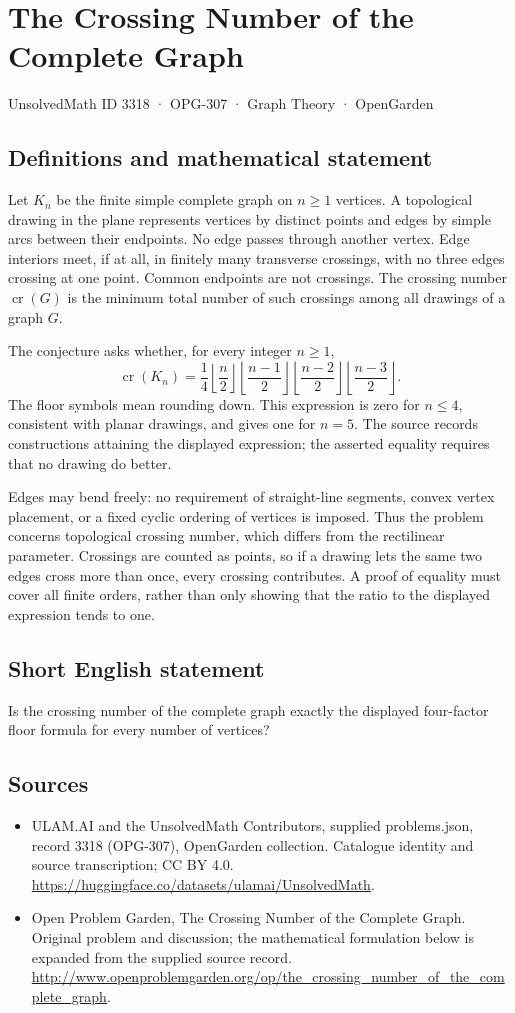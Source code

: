 \documentclass[11pt,a4paper]{article}
\begin{document}
\section*{The Crossing Number of the Complete Graph}\label{3318}
{\small UnsolvedMath ID 3318 · OPG-307 · Graph Theory · OpenGarden}
\subsection{Definitions and mathematical statement}
Let $K_n$ be the finite simple complete graph on $n\ge1$ vertices.
A topological drawing in the plane represents vertices by distinct
points and edges by simple arcs between their endpoints. No edge
passes through another vertex. Edge interiors meet, if at all, in
finitely many transverse crossings, with no three edges crossing
at one point. Common endpoints are not crossings. The crossing
number $\operatorname{cr}(G)$ is the minimum total number of such
crossings among all drawings of a graph $G$.

The conjecture asks whether, for every integer $n\ge1$,
\[
 \operatorname{cr}(K_n)=
 \frac14\left\lfloor\frac n2\right\rfloor
          \left\lfloor\frac{n-1}2\right\rfloor
          \left\lfloor\frac{n-2}2\right\rfloor
          \left\lfloor\frac{n-3}2\right\rfloor.
\]
The floor symbols mean rounding down. This expression is zero for
$n\le4$, consistent with planar drawings, and gives one for $n=5$.
The source records constructions attaining the displayed expression;
the asserted equality requires that no drawing do better.

Edges may bend freely: no requirement of straight-line segments,
convex vertex placement, or a fixed cyclic ordering of vertices is
imposed. Thus the problem concerns topological crossing number,
which differs from the rectilinear parameter. Crossings are counted
as points, so if a drawing lets the same two edges cross more than
once, every crossing contributes. A proof of equality must cover
all finite orders, rather than only showing that the ratio to the
displayed expression tends to one.
\subsection{Short English statement}
Is the crossing number of the complete graph exactly the displayed four-factor floor formula for every number of vertices?
\subsection{Sources}
\begin{itemize}
\item[S1] ULAM.AI and the UnsolvedMath Contributors, supplied problems.json, record 3318 (OPG-307), OpenGarden collection. Catalogue identity and source transcription; CC BY 4.0.
\url{https://huggingface.co/datasets/ulamai/UnsolvedMath}.
\item[S2] Open Problem Garden, The Crossing Number of the Complete Graph. Original problem and discussion; the mathematical formulation below is expanded from the supplied source record.
\url{http://www.openproblemgarden.org/op/the_crossing_number_of_the_complete_graph}.
\end{itemize}
\end{document}
